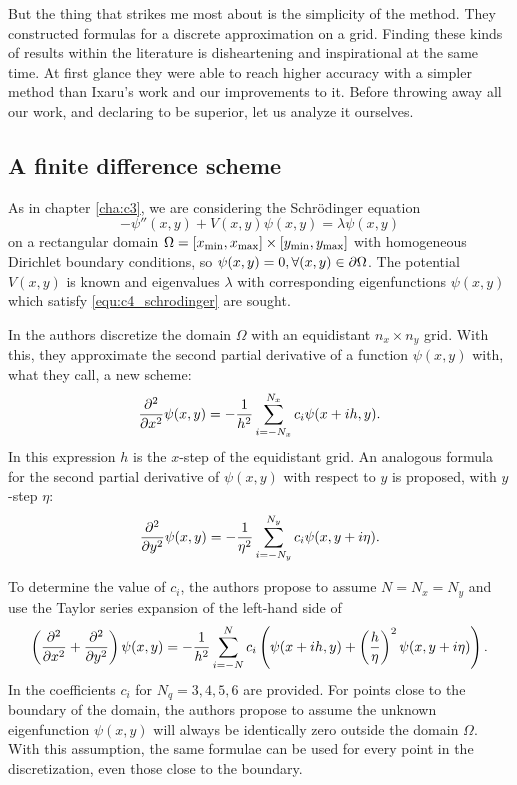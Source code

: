 But the thing that strikes me most about \cite{wang_new_2009} is the simplicity of the method. They constructed formulas for a discrete approximation on a grid. Finding these kinds of results within the literature is disheartening and inspirational at the same time. At first glance they were able to reach higher accuracy with a simpler method than Ixaru's work \cite{ixaru_new_2010} and our improvements \cite{baeyens_improvements_2022} to it. Before throwing away all our work, and declaring \cite{wang_new_2009} to be superior, let us analyze it ourselves.

\subsection{A finite difference scheme}

As in chapter \ref{cha:c3}, we are considering the Schrödinger equation
\begin{equation}\label{equ:c4_schrodinger}
    -\psi''(x, y) + V(x, y) \psi(x, y) = \lambda \psi(x, y)
\end{equation}
on a rectangular domain $\Omega = [{x_{\text{min}}}, {x_{\text{max}}}] \times [{y_{\text{min}}}, {y_{\text{max}}}]$ with homogeneous Dirichlet boundary conditions, so $\psi(x, y) = 0, \forall (x, y) \in \partial\Omega$. The potential $V(x, y)$ is known and eigenvalues $\lambda$ with corresponding eigenfunctions $\psi(x, y)$ which satisfy \eqref{equ:c4_schrodinger} are sought.

In \cite{wang_new_2009} the authors discretize the domain $\Omega$ with an equidistant $n_x \times n_y$ grid. With this, they approximate the second partial derivative of a function $\psi(x, y)$ with, what they call, a new scheme:
$$
    {\pdv[2]{}{x}}\psi(x, y) = -\frac{1}{h^2}\sum_{i=-N_x}^{N_x} c_i \psi(x + ih, y)\text{.}
$$
In this expression $h$ is the $x$-step of the equidistant grid. An analogous formula for the second partial derivative of $\psi(x, y)$ with respect to $y$ is proposed, with $y$-step $\eta$:
$$
    {\pdv[2]{}{y}}\psi(x, y) = -\frac{1}{\eta^2}\sum_{i=-N_y}^{N_y} c_i \psi(x, y + i\eta)\text{.}
$$

To determine the value of $c_i$, the authors propose to assume $N = N_x = N_y$ and use the Taylor series expansion of the left-hand side of
$$
    \left({\pdv[2]{}{x}} + {\pdv[2]{}{y}}\right)\psi(x, y) = -\frac{1}{h^2} \sum_{i=-N}^{N} c_i \left(\psi(x+ih, y) + \left(\frac{h}{\eta}\right)^2\psi(x, y+i\eta)\right)\text{.}
$$
In \cite{wang_new_2009} the coefficients $c_i$ for $N_q = 3, 4, 5, 6$ are provided. For points close to the boundary of the domain, the authors propose to assume the unknown eigenfunction $\psi(x, y)$ will always be identically zero outside the domain $\Omega$. With this assumption, the same formulae can be used for every point in the discretization, even those close to the boundary.

